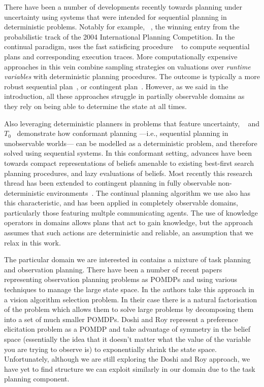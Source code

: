 There have been a number of developments recently towards planning
under uncertainty using systems that were intended for sequential
planning in deterministic problems.  Notably for example,
~\cite{yoon:etal:2007}, the winning entry from the
probabilistic track of the 2004 International Planning Competition.
In the continual paradigm,  uses the fast satisficing
procedure ~\cite{hoffmann:nebel:2001} to compute sequential
plans and corresponding execution traces.
More computationally expensive approaches in this vein combine
sampling strategies on valuations over {\em runtime variables} with
deterministic planning procedures. The outcome is typically a more
robust sequential plan~\cite{yoon:etal:2008}, or contingent
plan~\cite{majercik:2006}. However, as we said in the introduction,
all these approaches struggle in partially observable domains as they
rely on being able to determine the state at all times.

Also leveraging deterministic planners in problems that feature
uncertainty, ~\cite{hoffmann:brafman:2006} and
$T_0$~\cite{palacios:geffner:2009} demonstrate how conformant planning
---i.e., sequential planning in unobservable worlds--- can be modelled
as a deterministic problem, and therefore solved using sequential
systems. In this conformant setting, advances have been towards
compact representations of beliefs amenable to existing best-first
search planning procedures, and lazy evaluations of beliefs. Most
recently this research thread has been extended to contingent planning
in fully observable non-deterministic
environments~\cite{albore:etal:2009}.
The continual planning algorithm we use \cite{brenner:nebel:jaamas09}
also has this characteristic, and has been applied in completely
observable domains, particularly those featuring multple communicating
agents. The use of knowledge operators in domains allows plans that
act to gain knowledge, but the approach assumes that such actions are
deterministic and reliable, an assumption that we relax in this work.

The particular domain we are interested in contains a mixture of task
planning and observation planning. There have been a number of recent
papers representing observation planning problems as POMDPs and using
various techniques to manage the large state
space. In \cite{hippo-jnl} the authors take this approach in a vision
algorithm selection problem. In their case there is a natural
factorisation of the problem which allows them to solve large problems
by decomposing them into a set of much smaller POMDPs. Doshi and
Roy \cite{doshi08:pref_elic} represent a preference elicitation
problem as a POMDP and take advantage of symmetry in the belief space
(essentially the idea that it doesn't matter what the value of the
variable you are trying to observe is) to exponentially shrink the
state space. Unfortunately, although we are still exploring the Doshi
and Roy approach, we have yet to find structure we can exploit
similarly in our domain due to the task planning component.

